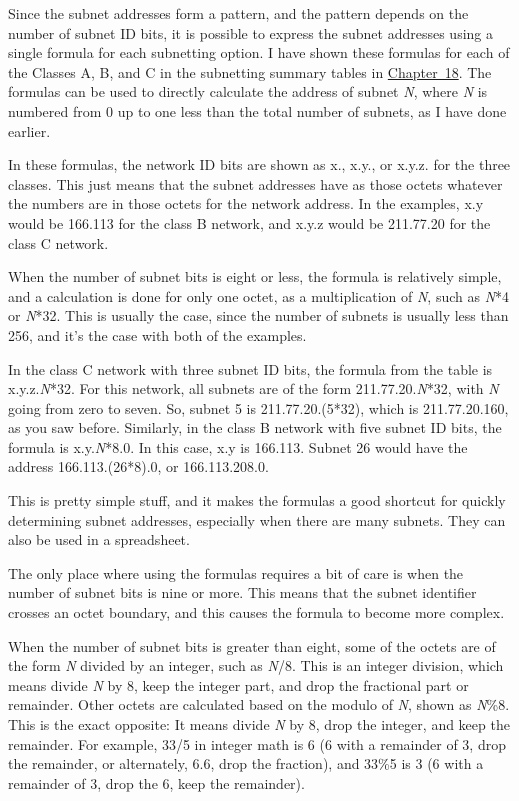\documentclass[b5paper,11pt]{memoir}
\begin{document}
\protect\hypertarget{ch19s04.htmlux5cux23idx-CHP-19-0752}{}{}Since the
subnet addresses form a pattern, and the pattern depends on the number
of subnet ID bits, it is possible to express the subnet addresses using
a single formula for each subnetting option. I have shown these formulas
for each of the Classes A, B, and C in the subnetting summary tables in
\protect\hyperlink{ch18.html}{Chapter~18}. The formulas can be used to
directly calculate the address of subnet {\emph{N}}, where {\emph{N}} is
numbered from 0 up to one less than the total number of subnets, as I
have done earlier.

In these formulas, the network ID bits are shown as x., x.y., or x.y.z.
for the three classes. This just means that the subnet addresses have as
those octets whatever the numbers are in those octets for the network
address. In the examples, x.y would be 166.113 for the class B network,
and x.y.z would be 211.77.20 for the class C network.

When the number of subnet bits is eight or less, the formula is
relatively simple, and a calculation is done for only one octet, as a
multiplication of {\emph{N}}, such as {\emph{N}}*4 or {\emph{N}}*32.
This is usually the case, since the number of subnets is usually less
than 256, and it's the case with both of the examples.

In the class C network with three subnet ID bits, the formula from the
table is x.y.z.{\emph{N}}*32. For this network, all subnets are of the
form 211.77.20.{\emph{N}}*32, with {\emph{N}} going from zero to seven.
So, subnet 5 is 211.77.20.(5*32), which is 211.77.20.160, as you saw
before. Similarly, in the class B network with five subnet ID bits, the
formula is x.y.{\emph{N}}*8.0. In this case, x.y is 166.113. Subnet 26
would have the address 166.113.(26*8).0, or 166.113.208.0.

This is pretty simple stuff, and it makes the formulas a good shortcut
for quickly determining subnet addresses, especially when there are many
subnets. They can also be used in a spreadsheet.

The only place where using the formulas requires a bit of care is when
the number of subnet bits is nine or more. This means that the subnet
identifier crosses an octet boundary, and this causes the formula to
become more complex.

When the number of subnet bits is greater than eight, some of the octets
are of the form {\emph{N}} divided by an integer, such as {\emph{N}}/8.
This is an integer division, which means divide {\emph{N}} by 8, keep
the integer part, and drop the fractional part or remainder. Other
octets are calculated based on the modulo of {\emph{N}}, shown as
{\emph{N}}\%8. This is the exact opposite: It means divide {\emph{N}} by
8, drop the integer, and keep the remainder. For example, 33/5 in
integer math is 6 (6 with a remainder of 3, drop the remainder, or
alternately, 6.6, drop the fraction), and 33\%5 is 3 (6 with a remainder
of 3, drop the 6, keep the remainder).
\end{document}
